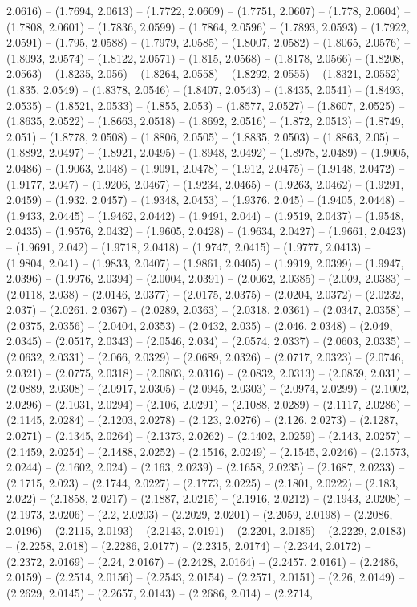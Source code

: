 2.0616) -- (1.7694, 2.0613) -- (1.7722, 2.0609) -- (1.7751, 2.0607) -- (1.778, 2.0604) -- (1.7808, 2.0601) -- (1.7836, 2.0599) -- (1.7864, 2.0596) -- (1.7893, 2.0593) -- (1.7922, 2.0591) -- (1.795, 2.0588) -- (1.7979, 2.0585) -- (1.8007, 2.0582) -- (1.8065, 2.0576) -- (1.8093, 2.0574) -- (1.8122, 2.0571) -- (1.815, 2.0568) -- (1.8178, 2.0566) -- (1.8208, 2.0563) -- (1.8235, 2.056) -- (1.8264, 2.0558) -- (1.8292, 2.0555) -- (1.8321, 2.0552) -- (1.835, 2.0549) -- (1.8378, 2.0546) -- (1.8407, 2.0543) -- (1.8435, 2.0541) -- (1.8493, 2.0535) -- (1.8521, 2.0533) -- (1.855, 2.053) -- (1.8577, 2.0527) -- (1.8607, 2.0525) -- (1.8635, 2.0522) -- (1.8663, 2.0518) -- (1.8692, 2.0516) -- (1.872, 2.0513) -- (1.8749, 2.051) -- (1.8778, 2.0508) -- (1.8806, 2.0505) -- (1.8835, 2.0503) -- (1.8863, 2.05) -- (1.8892, 2.0497) -- (1.8921, 2.0495) -- (1.8948, 2.0492) -- (1.8978, 2.0489) -- (1.9005, 2.0486) -- (1.9063, 2.048) -- (1.9091, 2.0478) -- (1.912, 2.0475) -- (1.9148, 2.0472) -- (1.9177, 2.047) -- (1.9206, 2.0467) -- (1.9234, 2.0465) -- (1.9263, 2.0462) -- (1.9291, 2.0459) -- (1.932, 2.0457) -- (1.9348, 2.0453) -- (1.9376, 2.045) -- (1.9405, 2.0448) -- (1.9433, 2.0445) -- (1.9462, 2.0442) -- (1.9491, 2.044) -- (1.9519, 2.0437) -- (1.9548, 2.0435) -- (1.9576, 2.0432) -- (1.9605, 2.0428) -- (1.9634, 2.0427) -- (1.9661, 2.0423) -- (1.9691, 2.042) -- (1.9718, 2.0418) -- (1.9747, 2.0415) -- (1.9777, 2.0413) -- (1.9804, 2.041) -- (1.9833, 2.0407) -- (1.9861, 2.0405) -- (1.9919, 2.0399) -- (1.9947, 2.0396) -- (1.9976, 2.0394) -- (2.0004, 2.0391) -- (2.0062, 2.0385) -- (2.009, 2.0383) -- (2.0118, 2.038) -- (2.0146, 2.0377) -- (2.0175, 2.0375) -- (2.0204, 2.0372) -- (2.0232, 2.037) -- (2.0261, 2.0367) -- (2.0289, 2.0363) -- (2.0318, 2.0361) -- (2.0347, 2.0358) -- (2.0375, 2.0356) -- (2.0404, 2.0353) -- (2.0432, 2.035) -- (2.046, 2.0348) -- (2.049, 2.0345) -- (2.0517, 2.0343) -- (2.0546, 2.034) -- (2.0574, 2.0337) -- (2.0603, 2.0335) -- (2.0632, 2.0331) -- (2.066, 2.0329) -- (2.0689, 2.0326) -- (2.0717, 2.0323) -- (2.0746, 2.0321) -- (2.0775, 2.0318) -- (2.0803, 2.0316) -- (2.0832, 2.0313) -- (2.0859, 2.031) -- (2.0889, 2.0308) -- (2.0917, 2.0305) -- (2.0945, 2.0303) -- (2.0974, 2.0299) -- (2.1002, 2.0296) -- (2.1031, 2.0294) -- (2.106, 2.0291) -- (2.1088, 2.0289) -- (2.1117, 2.0286) -- (2.1145, 2.0284) -- (2.1203, 2.0278) -- (2.123, 2.0276) -- (2.126, 2.0273) -- (2.1287, 2.0271) -- (2.1345, 2.0264) -- (2.1373, 2.0262) -- (2.1402, 2.0259) -- (2.143, 2.0257) -- (2.1459, 2.0254) -- (2.1488, 2.0252) -- (2.1516, 2.0249) -- (2.1545, 2.0246) -- (2.1573, 2.0244) -- (2.1602, 2.024) -- (2.163, 2.0239) -- (2.1658, 2.0235) -- (2.1687, 2.0233) -- (2.1715, 2.023) -- (2.1744, 2.0227) -- (2.1773, 2.0225) -- (2.1801, 2.0222) -- (2.183, 2.022) -- (2.1858, 2.0217) -- (2.1887, 2.0215) -- (2.1916, 2.0212) -- (2.1943, 2.0208) -- (2.1973, 2.0206) -- (2.2, 2.0203) -- (2.2029, 2.0201) -- (2.2059, 2.0198) -- (2.2086, 2.0196) -- (2.2115, 2.0193) -- (2.2143, 2.0191) -- (2.2201, 2.0185) -- (2.2229, 2.0183) -- (2.2258, 2.018) -- (2.2286, 2.0177) -- (2.2315, 2.0174) -- (2.2344, 2.0172) -- (2.2372, 2.0169) -- (2.24, 2.0167) -- (2.2428, 2.0164) -- (2.2457, 2.0161) -- (2.2486, 2.0159) -- (2.2514, 2.0156) -- (2.2543, 2.0154) -- (2.2571, 2.0151) -- (2.26, 2.0149) -- (2.2629, 2.0145) -- (2.2657, 2.0143) -- (2.2686, 2.014) -- (2.2714, 